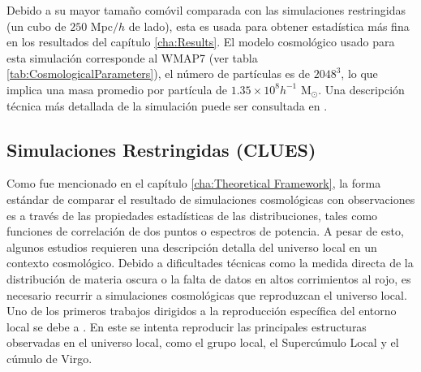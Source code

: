 Debido a su mayor tamaño comóvil comparada con las simulaciones 
restringidas (un cubo de $250$ Mpc$/h$ de lado), esta es usada para 
obtener estadística más fina en los resultados del capítulo 
\ref{cha:Results}. El modelo cosmológico usado para esta simulación 
corresponde al WMAP7 (ver tabla \ref{tab:CosmologicalParameters}), el número 
de partículas es de $2048^3$, lo que implica una masa promedio por partícula 
de $1.35 \times 10^8 h^{-1}$ M$_{\odot}$. Una descripción técnica más 
detallada de la simulación puede ser consultada en \cite{klypin2011}.
\newpage

	\subsection{Simulaciones Restringidas (CLUES)}
	\label{subsec:ConstrainedSimulations}


Como fue mencionado en el capítulo \ref{cha:Theoretical Framework}, la forma
estándar de comparar el resultado de simulaciones cosmológicas con 
observaciones es a través de las propiedades estadísticas de las 
distribuciones, tales como funciones de correlación de dos puntos o 
espectros de potencia. A pesar de esto, algunos estudios requieren una 
descripción detalla del universo local en un contexto cosmológico. Debido 
a dificultades técnicas como la medida directa de la distribución de materia
oscura o la falta de datos en altos corrimientos al rojo, es necesario 
recurrir a simulaciones cosmológicas que reproduzcan el universo local.
Uno de los primeros trabajos dirigidos a la reproducción específica del
entorno local se debe a \cite{Klypin2003}. En este se intenta reproducir las 
principales estructuras observadas en el universo local, como el grupo local,
el Supercúmulo Local y el cúmulo de Virgo.


